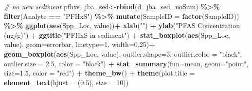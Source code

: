 \documentclass[
]{article}
\newenvironment{Shaded}{\begin{snugshade}}{\end{snugshade}}
\newcommand{\AttributeTok}[1]{\textcolor[rgb]{0.13,0.29,0.53}{#1}}
\newcommand{\CommentTok}[1]{\textcolor[rgb]{0.56,0.35,0.01}{\textit{#1}}}
\newcommand{\DecValTok}[1]{\textcolor[rgb]{0.00,0.00,0.81}{#1}}
\newcommand{\FloatTok}[1]{\textcolor[rgb]{0.00,0.00,0.81}{#1}}
\newcommand{\FunctionTok}[1]{\textcolor[rgb]{0.13,0.29,0.53}{\textbf{#1}}}
\newcommand{\NormalTok}[1]{#1}
\newcommand{\OtherTok}[1]{\textcolor[rgb]{0.56,0.35,0.01}{#1}}
\newcommand{\SpecialCharTok}[1]{\textcolor[rgb]{0.81,0.36,0.00}{\textbf{#1}}}
\newcommand{\StringTok}[1]{\textcolor[rgb]{0.31,0.60,0.02}{#1}}
\begin{document}
\begin{Shaded}
\begin{Highlighting}[]
\CommentTok{\# no new sediment}
\NormalTok{pfhxs\_jba\_sed}\OtherTok{\textless{}{-}}\FunctionTok{rbind}\NormalTok{(d\_jba\_sed\_noSum) }\SpecialCharTok{\%\textgreater{}\%} 
  \FunctionTok{filter}\NormalTok{(Analyte }\SpecialCharTok{==} \StringTok{"PFHxS"}\NormalTok{) }\SpecialCharTok{\%\textgreater{}\%} 
  \FunctionTok{mutate}\NormalTok{(}\AttributeTok{SampleID =} \FunctionTok{factor}\NormalTok{(SampleID)) }\SpecialCharTok{\%\textgreater{}\%} 
  \FunctionTok{ggplot}\NormalTok{(}\FunctionTok{aes}\NormalTok{(Spp\_Loc, value))}\SpecialCharTok{+}
    \FunctionTok{xlab}\NormalTok{(}\StringTok{""}\NormalTok{) }\SpecialCharTok{+}
    \FunctionTok{ylab}\NormalTok{(}\StringTok{"PFAS Concentration (ng/g)"}\NormalTok{) }\SpecialCharTok{+}
    \FunctionTok{ggtitle}\NormalTok{(}\StringTok{"PFHxS in sediment"}\NormalTok{) }\SpecialCharTok{+}
    \FunctionTok{stat\_boxplot}\NormalTok{(}\FunctionTok{aes}\NormalTok{(Spp\_Loc, value),}
                 \AttributeTok{geom=}\StringTok{\textquotesingle{}errorbar\textquotesingle{}}\NormalTok{, }\AttributeTok{linetype=}\DecValTok{1}\NormalTok{, }\AttributeTok{width=}\FloatTok{0.25}\NormalTok{)}\SpecialCharTok{+}
    \FunctionTok{geom\_boxplot}\NormalTok{(}\FunctionTok{aes}\NormalTok{(Spp\_Loc, value),}
                 \AttributeTok{outlier.shape=}\DecValTok{3}\NormalTok{,}
                 \AttributeTok{outlier.color =} \StringTok{"black"}\NormalTok{,}
                 \AttributeTok{outlier.size =} \FloatTok{2.5}\NormalTok{,}
                 \AttributeTok{color =} \StringTok{"black"}\NormalTok{) }\SpecialCharTok{+} 
    \FunctionTok{stat\_summary}\NormalTok{(}\AttributeTok{fun=}\NormalTok{mean, }\AttributeTok{geom=}\StringTok{"point"}\NormalTok{, }\AttributeTok{size=}\FloatTok{1.5}\NormalTok{, }\AttributeTok{color =} \StringTok{"red"}\NormalTok{) }\SpecialCharTok{+}
    \FunctionTok{theme\_bw}\NormalTok{() }\SpecialCharTok{+}
    \FunctionTok{theme}\NormalTok{(}\AttributeTok{plot.title =} \FunctionTok{element\_text}\NormalTok{(}\AttributeTok{hjust =}\NormalTok{ (}\FloatTok{0.5}\NormalTok{), }\AttributeTok{size =} \DecValTok{10}\NormalTok{))}


\end{Highlighting}
\end{Shaded}
\end{document}
